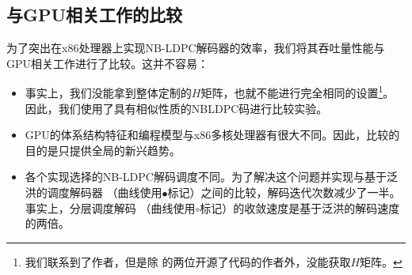 \documentclass{cjc}
\begin{document}
\subsection{与GPU相关工作的比较}

  为了突出在x86处理器上实现NB-LDPC解码器的效率，我们将其吞吐量性能与GPU相关工作进行了比较。这并不容易：
\begin{itemize}
  \item 事实上，我们没能拿到整体定制的$H$矩阵，也就不能进行完全相同的设置\footnote{我们联系到了作者，但是除
  \cite{noauthor_andrade_nodate,liu_high-throughput_2018}的两位开源了代码的作者外，没能获取$H$矩阵。}。
  因此，我们使用了具有相似性质的NBLDPC码进行比较实验。
  \item GPU的体系结构特征和编程模型与x86多核处理器有很大不同。因此，比较的目的是只提供全局的新兴趋势。
  \item 各个实现选择的NB-LDPC解码调度不同。为了解决这个问题并实现与基于泛洪的调度解码器
  （曲线使用$\bullet$标记）之间的比较，解码迭代次数减少了一半。事实上，分层调度解码
  （曲线使用$\circ$标记）的收敛速度是基于泛洪的解码\cite{beermann_gpu_2015}速度的两倍。
\end{itemize}
\end{document}
